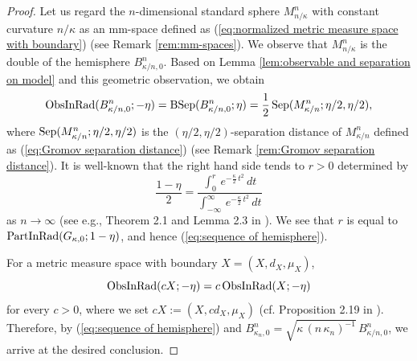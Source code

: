 \begin{proof}
Let us regard the $n$-dimensional standard sphere $M^{n}_{n/\kappa}$ with constant curvature $n/\kappa$ as an mm-space defined as (\ref{eq:normalized metric measure space with boundary}) (see Remark \ref{rem:mm-spaces}).
We observe that
$M^{n}_{n/\kappa}$ is the double of the hemisphere $B^{n}_{\kappa/n,0}$.
Based on Lemma \ref{lem:observable and separation on model} and this geometric observation,
we obtain
\begin{equation*}
\operatorname{ObsInRad}(B^{n}_{\kappa/n,0};-\eta)= \operatorname{BSep}(B^{n}_{\kappa/n,0};\eta)=\frac{1}{2}\operatorname{Sep}(M^{n}_{\kappa/n};\eta/2,\eta/2),
\end{equation*}
where $\operatorname{Sep}(M^{n}_{\kappa/n};\eta/2,\eta/2)$ is the $(\eta/2,\eta/2)$-separation distance of $M^{n}_{\kappa/n}$ defined as (\ref{eq:Gromov separation distance}) (see Remark \ref{rem:Gromov separation distance}).
It is well-known that
the right hand side tends to $r>0$ determined by
\begin{equation*}
\frac{1-\eta}{2}=\frac{\int^{r}_{0}\,e^{-\frac{\kappa}{2}\,t^{2}}\,    dt}{\int^{\infty}_{-\infty}\,e^{-\frac{\kappa}{2}\,t^{2}}\,    dt}
\end{equation*}
as $n\to \infty$ (see e.g., Theorem 2.1 and Lemma 2.3 in \cite{Sh}).
We see that $r$ is equal to $\operatorname{PartInRad}(G_{\kappa,0};1-\eta)$,
and hence (\ref{eq:sequence of hemisphere}).

For a metric measure space with boundary $X=(X,d_{X},\mu_{X})$,
\begin{equation}\label{eq:scaling formula}
\operatorname{ObsInRad}(cX;-\eta)=c \operatorname{ObsInRad}(X;-\eta)
\end{equation}
for every $c>0$,
where we set $cX:=(X,c d_{X},\mu_{X})$ (cf. Proposition 2.19 in \cite{Sh}).
Therefore,
by (\ref{eq:sequence of hemisphere}) and $B^{n}_{\kappa_{n},0}=\sqrt{\kappa\,(n\,\kappa_{n})^{-1}} \,B^{n}_{\kappa/n,0}$,
we arrive at the desired conclusion.
\end{proof}

